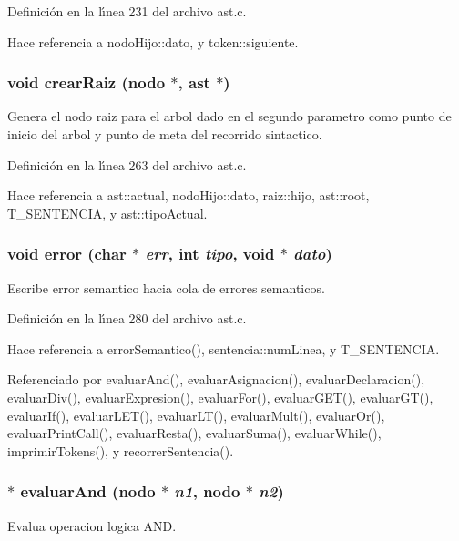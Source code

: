 Definici\'{o}n en la l\'{\i}nea 231 del archivo ast.c.

Hace referencia a nodo\-Hijo::dato, y token::siguiente.
\subsubsection{\setlength{\rightskip}{0pt plus 5cm}void crear\-Raiz ({\bf nodo} $\ast$, {\bf ast} $\ast$)}\label{ast_8h_a33}


Genera el nodo raiz para el arbol dado en el segundo parametro como punto de inicio del arbol y punto de meta del recorrido sintactico. 



Definici\'{o}n en la l\'{\i}nea 263 del archivo ast.c.

Hace referencia a ast::actual, nodo\-Hijo::dato, raiz::hijo, ast::root, T\_\-SENTENCIA, y ast::tipo\-Actual.
\subsubsection{\setlength{\rightskip}{0pt plus 5cm}void error (char $\ast$ {\em err}, int {\em tipo}, void $\ast$ {\em dato})}\label{ast_8h_a59}


Escribe error semantico hacia cola de errores semanticos. 



Definici\'{o}n en la l\'{\i}nea 280 del archivo ast.c.

Hace referencia a error\-Semantico(), sentencia::num\-Linea, y T\_\-SENTENCIA.

Referenciado por evaluar\-And(), evaluar\-Asignacion(), evaluar\-Declaracion(), evaluar\-Div(), evaluar\-Expresion(), evaluar\-For(), evaluar\-GET(), evaluar\-GT(), evaluar\-If(), evaluar\-LET(), evaluar\-LT(), evaluar\-Mult(), evaluar\-Or(), evaluar\-Print\-Call(), evaluar\-Resta(), evaluar\-Suma(), evaluar\-While(), imprimir\-Tokens(), y recorrer\-Sentencia().
\subsubsection{$\ast$ evaluar\-And ({\bf nodo} $\ast$ {\em n1}, {\bf nodo} $\ast$ {\em n2})}\label{ast_8h_a43}


Evalua operacion logica AND. 



